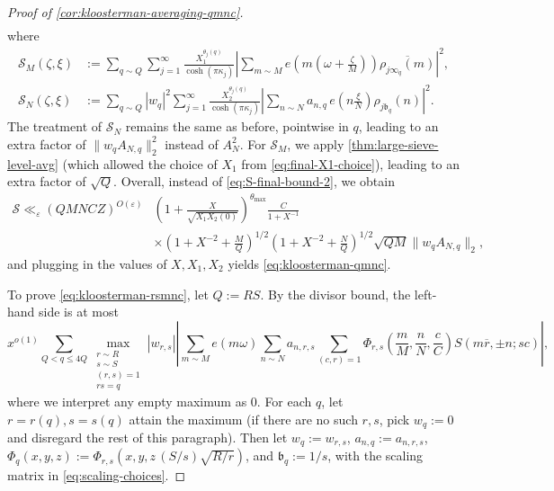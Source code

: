\documentclass[reqno,11pt]{amsart}
\theoremstyle{remark}
\numberwithin{equation}{section}
\newcommand{\mS}{\mathcal{S}}
\newcommand{\mb}{\mathfrak{b}}
\newcommand{\eps}{\varepsilon}
\renewcommand{\bar}{\overline}
\begin{document}
\begin{proof}[Proof of \cref{cor:kloosterman-averaging-qmnc}]
\[\begin{aligned}
\end{aligned}
\]
where 
\[
\begin{aligned}
    \mS_M(\zeta, \xi) &:= \sum_{q \sim Q}
    \sum_{j=1}^\infty \frac{X_1^{\theta_j(q)}}{\cosh(\pi \kappa_j)} 
    \left\vert \sum_{m \sim M} e\left(m \left(\omega + \frac{\zeta}{M}\right) \right) \bar{\rho_{j\infty_q}(m)} \right\vert^2,
    \\
    \mS_N(\zeta, \xi) &:= \sum_{q \sim Q} |w_q|^2
    \sum_{j=1}^\infty \frac{X_2^{\theta_j(q)}}{\cosh(\pi \kappa_j)} \left\vert \sum_{n \sim N} a_{n,q}\, e\left(n\frac{\xi}{N}\right) 
    \rho_{j\mb_q}(n)\right\vert^2.
\end{aligned}
\]
The treatment of $\mS_N$ remains the same as before, pointwise in $q$, leading to an extra factor of $\|w_q A_{N,q}\|_2^2$ instead of $A_N^2$. For $\mS_M$, we apply \cref{thm:large-sieve-level-avg} (which allowed the choice of $X_1$ from \cref{eq:final-X1-choice}), leading to an extra factor of $\sqrt{Q}$. Overall, instead of \cref{eq:S-final-bound-2}, we obtain
\[
\begin{aligned}
    \mS \ll_\eps (QMNCZ)^{O(\eps)}
    &\left(1 + \frac{X}{\sqrt{X_1 X_2(0)}} \right)^{\theta_{\max}}
    \frac{C}{1+X^{-1}} 
    \\
    &\times 
    \left(1 + X^{-2} + \frac{M}{Q}\right)^{1/2}
    \left(1 + X^{-2} + \frac{N}{Q}\right)^{1/2} \sqrt{QM} \|w_q A_{N,q}\|_2,
\end{aligned}
\]
and plugging in the values of $X, X_1, X_2$ yields \cref{eq:kloosterman-qmnc}.

To prove \cref{eq:kloosterman-rsmnc}, let $Q := RS$. By the divisor bound, the left-hand side is at most
\[
    x^{o(1)} \sum_{Q < q \le 4Q}
    \max_{\substack{r \sim R \\ s \sim S \\ (r, s) = 1 \\ rs = q}} |w_{r,s}| 
    \left\vert 
    \sum_{m \sim M} e(m\omega)
    \sum_{n \sim N} a_{n,r,s}
    \sum_{(c, r) = 1}
    \Phi_{r,s} \left(\frac{m}{M}, \frac{n}{N}, \frac{c}{C}\right)
    S(m\bar{r}, \pm n; sc)
    \right\vert,
\]
where we interpret any empty maximum as $0$. For each $q$, let $r = r(q), s = s(q)$ attain the maximum (if there are no such $r, s$, pick $w_q := 0$ and disregard the rest of this paragraph). Then let $w_q := w_{r,s}$, $a_{n,q} := a_{n,r,s}$, $\Phi_q(x, y, z) := \Phi_{r,s}(x, y, z\, (S/s) \sqrt{R/r})$, and $\mb_q := 1/s$, with the scaling matrix in \cref{eq:scaling-choices}.


\end{proof}
\end{document}
